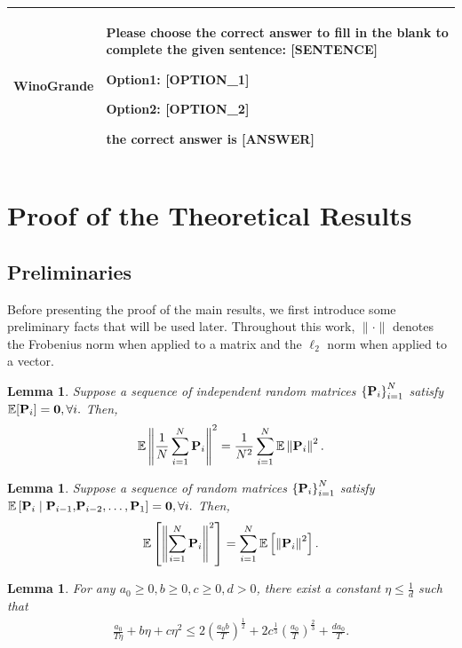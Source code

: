 \documentclass{article} %
\theoremstyle{plain}
\newtheorem{lemma}[theorem]{Lemma}
\theoremstyle{definition}
\begin{document}
\begin{table}[H]
\begin{tabularx}{\textwidth}{lX}
WinoGrande & 
\begin{minipage}{\linewidth}
\begin{tcolorbox}[colback=gray!10,colframe=black!75!black, left=1mm, right=1mm, top=1mm, bottom=1mm]
Please choose the correct answer to fill in the blank to complete the given sentence: [SENTENCE]

Option1: [OPTION\_1]

Option2: [OPTION\_2]

the correct answer is [ANSWER]
\end{tcolorbox}
\end{minipage} \\
\bottomrule

\end{tabularx}
\end{table}

\section{Proof of the Theoretical Results}
\subsection{Preliminaries}
Before presenting the proof of the main results, we first introduce some preliminary facts that will be used later. Throughout this work, $\|\cdot\|$ denotes the Frobenius norm when applied to a matrix and the $\ell_2$ norm when applied to a vector.

\begin{lemma}\label{pre:lemma:variable:0}
    Suppose a sequence of independent random matrices $\left\{{\bf P}_i\right\}_{i=1}^N$ satisfy $\mathbb{E}[{\bf P}_i] = {\bf 0}, \forall i.$ Then, $$\mathbb{E}\left\|\frac{1}{N} \sum_{i=1}^N {\bf P}_i\right\|^2 = \frac{1}{N^2} \sum_{i=1}^N \mathbb{E} \left\|{\bf P}_i\right\|^2.$$
\end{lemma}

\begin{lemma} {\normalfont \citep[Lemma 2]{jianyu}}\label{pre:lemma:jianyu}
Suppose a sequence of random matrices $\left\{{\bf P}_i\right\}_{i=1}^N$ satisfy $\mathbb{E} \left[{\bf P}_i \mid {\bf P}_{i-1}, \!{\bf P}_{i-2}, \ldots, {\bf P}_1 \right]={\bf 0}, \forall i.$ Then,
$$
\mathbb{E}\left[\left\|\sum_{i=1}^N {\bf P}_i\right\|^2\right]=\sum_{i=1}^N \mathbb{E}\left[\left\|{\bf P}_i\right\|^2\right] .
$$
\end{lemma}

\begin{lemma}\label{lemma:tune_stepsize}
{\normalfont \citep[Lemma 17]{koloskova2020unified}}\label{converging_iterates} For any $a_0 \geq 0, b\geq 0, c\geq 0, d >0$, there exist a constant $\eta \leq \frac{1}{d}$ such that
\begin{align}
\frac{a_0}{T \eta } + b \eta + c \eta^2 \leq 2 \left( \frac{a_0 b}{T} \right)^{\frac{1}{2}} + 2 c^{\frac{1}{3}} \left(\frac{a_0}{T}\right)^{\frac{2}{3}} + \frac{d a_0}{T}.
\end{align}
\end{lemma}
\end{document}
